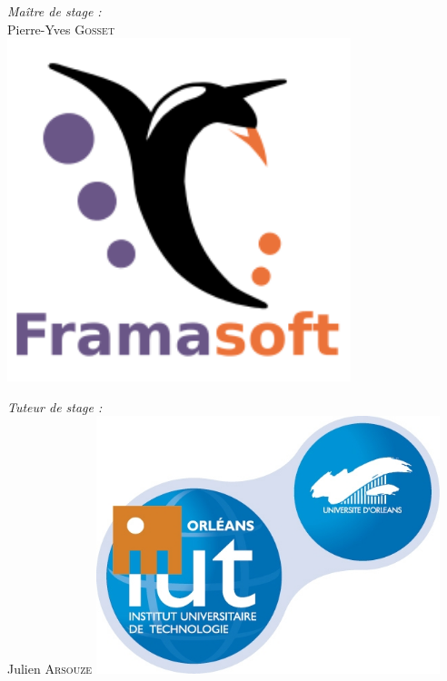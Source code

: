 \documentclass[10pt,a4paper, twoside]{report}
\begin{document}
\begin{titlepage}
		\begin{minipage}{0.45\textwidth}
		\begin{flushleft} \large
		\emph{Maître de stage :}\\
		Pierre-Yves \textsc{Gosset}\\
		\includegraphics[width=0.75\textwidth]{images/Framasoft-Logo.png}\par\vspace{1cm}
		\end{flushleft}
		\end{minipage}
		\begin{minipage}{0.45\textwidth}
		\begin{flushright} \large
		\emph{Tuteur de stage :}\\
		Julien \textsc{Arsouze}
		\includegraphics[width=0.75\textwidth]{images/logo-iut.png}\par\vspace{1cm}
		\end{flushright}
		\end{minipage}\\[1.5cm]
		\vfill
	\end{titlepage}
	
\end{document}
